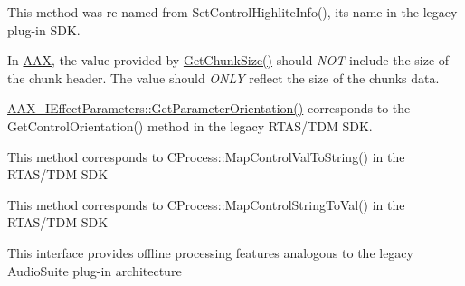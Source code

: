 \begin{DoxyRefList}
 This method was re-\/named from {\ttfamily Set\+Control\+Highlite\+Info()}, its name in the legacy plug-\/in SDK. 
\item[Member \mbox{\hyperlink{a01953_aa986711cd372febcaae803e86ae08f63}{AAX\+\_\+\+IACFEffect\+Parameters\+::Get\+Chunk\+Size}} (AAX\+\_\+\+CType\+ID i\+Chunk\+ID, uint32\+\_\+t $\ast$o\+Size) const =0]\label{a00802__porting_notes000035}%
%
 In \mbox{\hyperlink{a00868}{AAX}}, the value provided by \mbox{\hyperlink{a01953_aa986711cd372febcaae803e86ae08f63}{Get\+Chunk\+Size()}} should {\itshape NOT} include the size of the chunk header. The value should {\itshape ONLY} reflect the size of the chunk\textquotesingle{}s data. 
\item[Member \mbox{\hyperlink{a01953_ac122e1a693296b059dca4350a5ff1dfe}{AAX\+\_\+\+IACFEffect\+Parameters\+::Get\+Parameter\+Orientation}} (AAX\+\_\+\+CParam\+ID i\+Parameter\+ID, AAX\+\_\+\+EParameter\+Orientation $\ast$o\+Parameter\+Orientation) const =0]\label{a00802__porting_notes000032}%
%
 \mbox{\hyperlink{a01953_ac122e1a693296b059dca4350a5ff1dfe}{AAX\+\_\+\+IEffect\+Parameters\+::\+Get\+Parameter\+Orientation()}} corresponds to the Get\+Control\+Orientation() method in the legacy RTAS/\+TDM SDK. 
\item[Member \mbox{\hyperlink{a01953_add995f2eb5a3967c48dd9f3e21f003aa}{AAX\+\_\+\+IACFEffect\+Parameters\+::Get\+Parameter\+String\+From\+Value}} (AAX\+\_\+\+CParam\+ID i\+Parameter\+ID, double i\+Value, \mbox{\hyperlink{a02161}{AAX\+\_\+\+IString}} $\ast$o\+Value\+String, int32\+\_\+t i\+Max\+Length) const =0]\label{a00802__porting_notes000034}%
%
 This method corresponds to CProcess\+::\+Map\+Control\+Val\+To\+String() in the RTAS/\+TDM SDK 
\item[Member \mbox{\hyperlink{a01953_a54bb12c9798e4f9a3a5b5d6f30ace992}{AAX\+\_\+\+IACFEffect\+Parameters\+::Get\+Parameter\+Value\+From\+String}} (AAX\+\_\+\+CParam\+ID i\+Parameter\+ID, double $\ast$o\+Value, const \mbox{\hyperlink{a02161}{AAX\+\_\+\+IString}} \&i\+Value\+String) const =0]\label{a00802__porting_notes000033}%
%
 This method corresponds to CProcess\+::\+Map\+Control\+String\+To\+Val() in the RTAS/\+TDM SDK 
\item[Class \mbox{\hyperlink{a01977}{AAX\+\_\+\+IACFHost\+Processor}} ]\label{a00802__porting_notes000036}%
%
 This interface provides offline processing features analogous to the legacy Audio\+Suite plug-\/in architecture 

\end{DoxyRefList}
